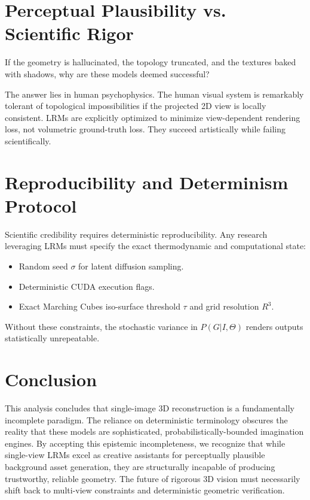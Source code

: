 \documentclass[10pt,journal,compsoc]{IEEEtran}
\begin{document}
\section{Perceptual Plausibility vs. Scientific Rigor}
If the geometry is hallucinated, the topology truncated, and the textures baked with shadows, why are these models deemed successful? 

The answer lies in human psychophysics. The human visual system is remarkably tolerant of topological impossibilities if the projected 2D view is locally consistent. LRMs are explicitly optimized to minimize view-dependent rendering loss, not volumetric ground-truth loss. They succeed artistically while failing scientifically.

\section{Reproducibility and Determinism Protocol}
Scientific credibility requires deterministic reproducibility. Any research leveraging LRMs must specify the exact thermodynamic and computational state:
\begin{itemize}
    \item Random seed $\sigma$ for latent diffusion sampling.
    \item Deterministic CUDA execution flags.
    \item Exact Marching Cubes iso-surface threshold $\tau$ and grid resolution $R^3$.
\end{itemize}
Without these constraints, the stochastic variance in $P(G | I, \Theta)$ renders outputs statistically unrepeatable.

\section{Conclusion}
This analysis concludes that single-image 3D reconstruction is a fundamentally incomplete paradigm. The reliance on deterministic terminology obscures the reality that these models are sophisticated, probabilistically-bounded imagination engines. By accepting this epistemic incompleteness, we recognize that while single-view LRMs excel as creative assistants for perceptually plausible background asset generation, they are structurally incapable of producing trustworthy, reliable geometry. The future of rigorous 3D vision must necessarily shift back to multi-view constraints and deterministic geometric verification.
\end{document}
